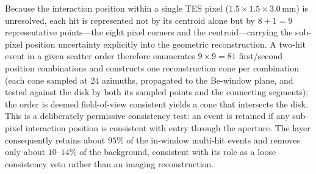\documentclass[11pt]{article}
\begin{document}
Because the interaction position within a single TES pixel
($1.5\times1.5\times3.0\,\mathrm{mm}$) is unresolved, each hit is represented not
by its centroid alone but by $8+1=9$ representative points---the eight pixel
corners and the centroid---carrying the sub-pixel position uncertainty
explicitly into the geometric reconstruction. A two-hit event in a given scatter
order therefore enumerates $9\times9=81$ first/second position combinations and
constructs one reconstruction cone per combination (each cone sampled at 24
azimuths, propagated to the Be-window plane, and tested against the disk by both
its sampled points and the connecting segments); the order is deemed
field-of-view consistent  yields a cone that
intersects the disk. This is a deliberately permissive consistency test: an
event is retained if any sub-pixel interaction position is consistent with entry
through the aperture. The layer consequently retains about $95\%$ of the
in-window multi-hit events and removes only about $10$--$14\%$ of the background,
consistent with its role as a loose consistency veto rather than an imaging
reconstruction.
\end{document}
